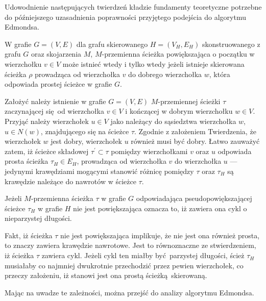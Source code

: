 {  Udowodnienie następujących twierdzeń kładzie fundamenty teoretyczne potrzebne do późniejszego uzasadnienia poprawności przyjętego podejścia do algorytmu Edmondsa.
  \begin{theorem}
    W grafie $G=(V, E)$ dla grafu skierowanego $H=(V_H,E_H)$ skonstruowanego z grafu $G$ oraz skojarzenia $M$, $M$-przemienna ścieżka powiększająca o początku w wierzchołku $v \in V$ może istnieć wtedy i tylko wtedy jeżeli istnieje skierowana ścieżka $\rho$ prowadząca od wierzchołka $v$ do dobrego wierzchołka $w$, która odpowiada prostej ścieżce w grafie $G$.
  \end{theorem}
  \begin{bproof}
    Założyć należy istnienie w grafie $G=(V, E)$ $M$-przemiennej ścieżki $\tau$ zaczynającej się od wierzchołka $v \in V$ i kończącej w dobrym wierzchołku $w \in V$. Przyjąć należy wierzchołek $u \in V$ jako należący do sąsiedztwa wierzchołka $w$, $u \in N(w)$, znajdującego się na ścieżce $\tau$.
    Zgodnie z założeniem Twierdzenia, że wierzchołek $w$ jest dobry, wierzchołek $u$ również musi być dobry.
    Łatwo zauważyć zatem, iż ścieżce składowej $\tau^\prime \subset \tau$ pomiędzy wierzchołkami $v$ oraz $u$ odpowiada prosta ścieżka $\tau_H \in E_H$, prowadząca od wierzchołka $v$ do wierzchołka $u$ --- jedynymi krawędziami mogącymi stanowić różnicę pomiędzy $\tau$ oraz $\tau_H$ są krawędzie należące do nawrotów w ścieżce $\tau$.
  \end{bproof}
  \begin{theorem}
    Jeżeli $M$-przemienna ścieżka $\tau$ w grafie $G$ odpowiadająca pseudopowiększającej ścieżce $\tau_H$ w grafie $H$ nie jest powiększająca oznacza to, iż zawiera ona cykl o nieparzystej długości.
  \end{theorem}
  \begin{bproof}
    Fakt, iż ścieżka $\tau$ nie jest powiększająca implikuje, że nie jest ona również prosta, to znaczy zawiera krawędzie nawrotowe.
    Jest to równoznaczne ze stwierdzeniem, iż ścieżka $\tau$ zawiera cykl.
    Jeżeli cykl ten miałby być parzystej długości, ścież $\tau_H$ musiałaby co najmniej dwukrotnie przechodzić przez pewien wierzchołek, co przeczy założeniu, iż stanowi jest ona prostą ścieżką skierowaną.
  \end{bproof}
  Mając na uwadze te zależności, można przejść do analizy algorytmu Edmondsa.
}
